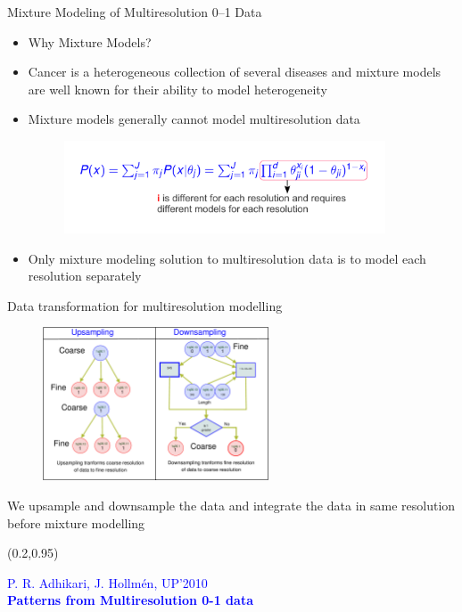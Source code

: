 \documentclass[first=dgreen,second=purple,logo=redexc]{aaltoslides}
\newcommand\FrameText[1]{%
  \begin{textblock*}{0.98\textwidth}(0.2\textwidth,0.95\textheight)
    \textcolor {blue}{\scriptsize\raggedright #1\hspace{0.1\textwidth}}
  \end{textblock*}}
\begin{document}
\begin{frame} {Mixture Modeling of Multiresolution 0--1 Data} 
\small
\begin{itemize}\setlength{\itemsep}{1mm}
    \item {\color{red} {Why Mixture Models?}}
    \item Cancer is a heterogeneous collection of several diseases and mixture models are well known for their ability to model heterogeneity
    \item Mixture models generally cannot model multiresolution data
    
    \vspace{-2mm}
    
      \begin{figure}
      \centering
      \includegraphics[trim=1cm 1.3cm 1cm 1.3cm, clip=true, width=0.9\textwidth]{figures/multieq}
      \end{figure}
      
          \vspace{-2mm}

     \item Only mixture modeling solution to multiresolution data is to model each resolution separately 
\end{itemize}
\end{frame}


\begin{frame}{Data transformation for multiresolution modelling}
\begin{figure}
\centering
  \includegraphics[trim=0cm 0cm 0cm 0cm, clip=true,width=0.60\textwidth]{figures/nweighted}
\end{figure}
\vspace{-5mm}
\scriptsize
We upsample and downsample the data and integrate the data in same resolution before mixture modelling
\FrameText{P. R. Adhikari, J. Hollm{\'e}n, UP'2010 \\ \textbf{Patterns from Multiresolution 0-1 data}}
\end{frame}
\end{document}
